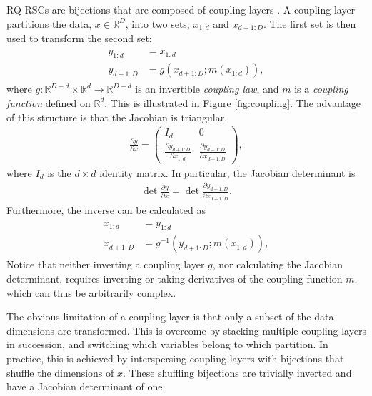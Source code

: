 \documentclass[twocolumn,twocolappendix,linenumbers]{aastex631}
\newcommand{\R}{\mathbb{R}}
\begin{document}
RQ-RSCs are bijections that are composed of coupling layers \citep{dinh2015, dinh2017}.
A coupling layer partitions the data, $x \in \R^D$, into two sets, $x_{1:d}$ and $x_{d+1:D}$.
The first set is then used to transform the second set:
\begin{align}
    \begin{split}
    y^{}_{1:d} &= x^{}_{1:d} \\
    y^{}_{d+1:D} &= g(x^{}_{d+1:D}; m(x^{}_{1:d})),
    \end{split}
\end{align}
where $g : \R^{D-d} \times \R^d \to \R^{D-d}$ is an invertible \emph{coupling law}, and $m$ is a \emph{coupling function} defined on $\R^d$.
This is illustrated in Figure \ref{fig:coupling}.
The advantage of this structure is that the Jacobian is triangular,
\begin{align}
    \frac{\partial y}{\partial x} =
    \begin{pmatrix}
         I_d & 0 \\
         \frac{\partial y^{}_{d+1:D}}{\partial x^{}_{1:d}}
         & \frac{\partial y^{}_{d+1:D}}{\partial x^{}_{d+1:D}}
    \end{pmatrix},
\end{align}
where $I_d$ is the $d \times d$ identity matrix.
In particular, the Jacobian determinant is
\begin{align}
    \det \frac{\partial y}{\partial x} = \det \frac{\partial y^{}_{d+1:D}}{\partial x^{}_{d+1:D}}.
\end{align}
Furthermore, the inverse can be calculated as
\begin{align}
    \begin{split}
    x^{}_{1:d} &= y^{}_{1:d} \\
    x^{}_{d+1:D} &= g^{-1}(y^{}_{d+1:D}; m(x^{}_{1:d})),
    \end{split}
\end{align}
Notice that neither inverting a coupling layer $g$, nor calculating the Jacobian determinant, requires inverting or taking derivatives of the coupling function $m$, which can thus be arbitrarily complex.

The obvious limitation of a coupling layer is that only a subset of the data dimensions are transformed.
This is overcome by stacking multiple coupling layers in succession, and switching which variables belong to which partition.
In practice, this is achieved by interspersing coupling layers with bijections that shuffle the dimensions of $x$.
These shuffling bijections are trivially inverted and have a Jacobian determinant of one.
\end{document}
